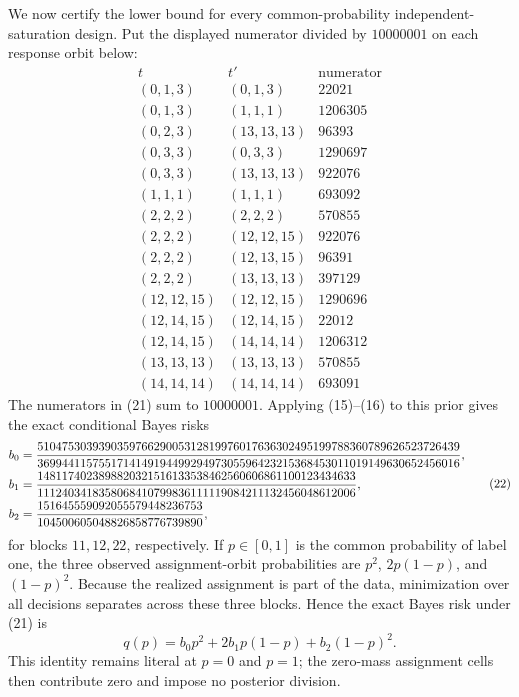 We now certify the lower bound for every common-probability independent-saturation design.  Put the displayed numerator divided by \(10000001\) on each response orbit below:
\[
\begin{array}{c|c|r}
t&t'&\text{numerator}\\ \hline
(0,1,3)&(0,1,3)&22021\\
(0,1,3)&(1,1,1)&1206305\\
(0,2,3)&(13,13,13)&96393\\
(0,3,3)&(0,3,3)&1290697\\
(0,3,3)&(13,13,13)&922076\\
(1,1,1)&(1,1,1)&693092\\
(2,2,2)&(2,2,2)&570855\\
(2,2,2)&(12,12,15)&922076\\
(2,2,2)&(12,13,15)&96391\\
(2,2,2)&(13,13,13)&397129\\
(12,12,15)&(12,12,15)&1290696\\
(12,14,15)&(12,14,15)&22012\\
(12,14,15)&(14,14,14)&1206312\\
(13,13,13)&(13,13,13)&570855\\
(14,14,14)&(14,14,14)&693091
\end{array}                                                                 \tag{21}
\]
The numerators in (21) sum to \(10000001\).  Applying (15)--(16) to this prior gives the exact conditional Bayes risks
\[
\begin{split}
b_0&={510475303939035976629005312819976017636302495199788360789626523726439
\over369944115755171414919449929497305596423215368453011019149630652456016},\\
b_1&={1481174023898820321516133538462560606861100123434633
\over1112403418358068410799836111119084211132456048612006},\\
b_2&={151645559092055579448236753
\over104500605048826858776739890},
\end{split}                                                                 \tag{22}
\]
for blocks \(11,12,22\), respectively.  If \(p\in[0,1]\) is the common probability of label one, the three observed assignment-orbit probabilities are \(p^2\), \(2p(1-p)\), and \((1-p)^2\).  Because the realized assignment is part of the data, minimization over all decisions separates across these three blocks.  Hence the exact Bayes risk under (21) is
\[
q(p)=b_0p^2+2b_1p(1-p)+b_2(1-p)^2.                                        \tag{23}
\]
This identity remains literal at \(p=0\) and \(p=1\); the zero-mass assignment cells then contribute zero and impose no posterior division.

